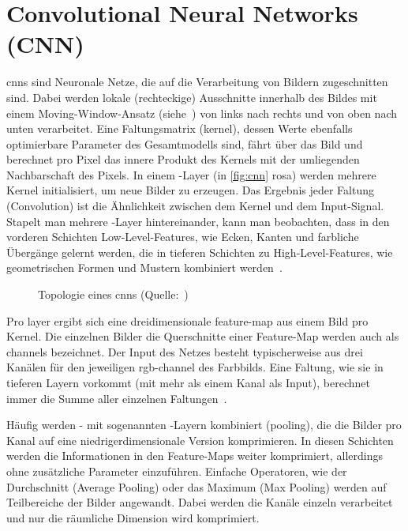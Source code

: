 \label{sec:conv}

\section{Convolutional Neural Networks (CNN)}
\label{sec:cnn}

\glspl{cnn} sind Neuronale Netze, die auf die Verarbeitung von Bildern zugeschnitten sind.
Dabei werden lokale (rechteckige) Ausschnitte innerhalb des Bildes mit einem Moving-Window-Ansatz (siehe~\cite{Burkov19}) von links nach rechts und von oben nach unten verarbeitet.
Eine Faltungsmatrix (\gls{kernel}), dessen Werte ebenfalls optimierbare Parameter des Gesamtmodells sind, fährt über das Bild und berechnet pro Pixel das innere Produkt des Kernels mit der umliegenden Nachbarschaft des Pixels.
In einem \conv-Layer (in \autoref{fig:cnn} rosa) werden mehrere Kernel initialisiert, um neue Bilder zu erzeugen.
Das Ergebnis jeder Faltung (Convolution) ist die Ähnlichkeit zwischen dem Kernel und dem Input-Signal.
Stapelt man mehrere \conv-Layer hintereinander, kann man beobachten, dass in den vorderen Schichten Low-Level-Features, wie Ecken, Kanten und farbliche Übergänge gelernt werden, die in tieferen Schichten zu High-Level-Features, wie geometrischen Formen und Mustern kombiniert werden~\cite{Burkov19}.

\begin{figure}[hb!]
    \centering
    \caption[Topologie eines \glspl{cnn}]{Topologie eines \glspl{cnn} (Quelle:~\cite{Veen17})}
    \label{fig:cnn}
\end{figure}

Pro \gls{layer} ergibt sich eine dreidimensionale \gls{feature-map} aus einem Bild pro Kernel.
Die einzelnen Bilder \bzw die Querschnitte einer Feature-Map werden auch als \glspl{channel} bezeichnet.
Der Input des Netzes besteht typischerweise aus drei Kanälen für den jeweiligen \gls{rgb}-\gls{channel} des Farbbilds.
Eine Faltung, wie sie in tieferen Layern vorkommt (mit mehr als einem Kanal als Input), berechnet immer die Summe aller einzelnen Faltungen~\cite{Burkov19}.

Häufig werden \conv- mit sogenannten \pool-Layern kombiniert (\gls{pooling}), die die Bilder pro Kanal auf eine niedrigerdimensionale Version komprimieren.
In diesen Schichten werden die Informationen in den Feature-Maps weiter komprimiert, allerdings ohne zusätzliche Parameter einzuführen.
Einfache Operatoren, wie der Durchschnitt (Average Pooling) oder das Maximum (Max Pooling) werden auf Teilbereiche der Bilder angewandt.
Dabei werden die Kanäle einzeln verarbeitet und nur die räumliche Dimension wird komprimiert.

